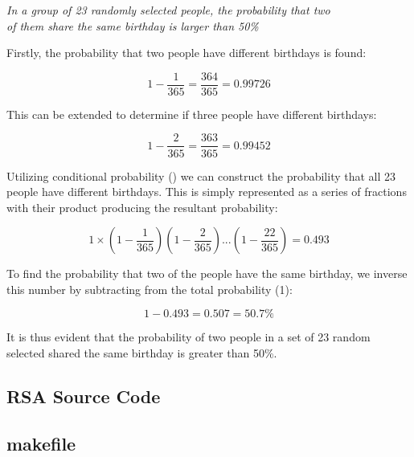 \documentclass[]{article}
\begin{document}
\vspace{0.5cm}
\begin{center}
\textit{In a group of 23 randomly selected people, the probability that two\\ of them share the same birthday is larger than 50\%}
\end{center}
\vspace{0.5cm}

\noindent
Firstly, the probability that two people have different birthdays is found:

$$1-\frac{1}{365}=\frac{364}{365}=0.99726$$

\vspace{0.5cm}
\noindent
This can be extended to determine if three people have different birthdays:

$$1-\frac{2}{365}=\frac{363}{365}=0.99452$$

\vspace{0.5cm}
\noindent
Utilizing conditional probability (\cite{lecture2}) we can construct the probability that all 23 people have different birthdays. This is simply represented as a series of fractions with their product producing the resultant probability:

$$1\times(1-\frac{1}{365})(1-\frac{2}{365})...(1-\frac{22}{365})=0.493$$

\vspace{0.5cm}
\noindent
To find the probability that two of the people have the same birthday, we inverse this number by subtracting from the total probability (1):

$$1-0.493=0.507=50.7\%$$

\vspace{0.5cm}
\noindent
It is thus evident that the probability of two people in a set of 23 random selected shared the same birthday is greater than 50\%.

\pagebreak


\vspace*{-0.8cm}
\begin{center}
	\section*{RSA Source Code}
\end{center}

\subsection*{makefile}
\pagebreak{}
\end{document}
